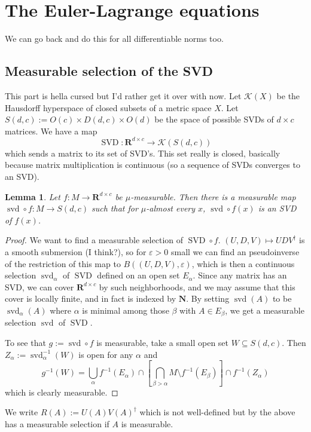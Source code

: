 \documentclass[reqno,11pt]{amsart}
\newcommand{\NN}{\mathbf{N}}
\newcommand{\RR}{\mathbf{R}}
\DeclareMathOperator{\svd}{svd}
\DeclareMathOperator{\SVD}{SVD}
\newtheorem{lemma}[theorem]{Lemma}
\theoremstyle{definition}
\numberwithin{equation}{section}
\begin{document}
\section{The Euler-Lagrange equations}
We can go back and do this for all differentiable norms too.

\subsection{Measurable selection of the SVD}
This part is hella cursed but I'd rather get it over with now.
Let $\mathscr K(X)$ be the Hausdorff hyperspace of closed subsets of a metric space $X$.
Let $S(d, c) := O(c) \times D(d, c) \times O(d)$ be the space of possible SVDs of $d \times c$ matrices.
We have a map 
$$\SVD: \RR^{d \times c} \to \mathscr K(S(d, c))$$
which sends a matrix to its set of SVD's.
This set really is closed, basically because matrix multiplication is continuous (so a sequence of SVDs converges to an SVD).

\begin{lemma}
Let $f: M \to \RR^{d \times c}$ be $\mu$-measurable.
Then there is a measurable map $\svd \circ f: M \to S(d, c)$ such that for $\mu$-almost every $x$, $\svd \circ f(x)$ is an SVD of $f(x)$.
\end{lemma}
\begin{proof}
We want to find a measurable selection of $\SVD \circ f$.
$(U, D, V) \mapsto UDV^\dagger$ is a smooth submersion (I think?), so for $\varepsilon > 0$ small we can find an pseudoinverse of the restriction of this map to $B((U, D, V), \varepsilon)$, which is then a continuous selection $\svd_\alpha$ of $\SVD$ defined on an open set $E_\alpha$.
Since any matrix has an SVD, we can cover $\RR^{d \times c}$ by such neighborhoods, and we may assume that this cover is locally finite, and in fact is indexed by $\NN$.
By setting $\svd(A)$ to be $\svd_\alpha(A)$ where $\alpha$ is minimal among those $\beta$ with $A \in E_\beta$, we get a measurable selection $\svd$ of $\SVD$.

To see that $g := \svd \circ f$ is measurable, take a small open set $W \subseteq S(d, c)$.
Then $Z_\alpha := \svd_\alpha^{-1}(W)$ is open for any $\alpha$ and
$$g^{-1}(W) = \bigcup_\alpha f^{-1}(E_\alpha) \cap \left[\bigcap_{\beta > \alpha} M \setminus f^{-1}(E_\beta)\right] \cap f^{-1}(Z_\alpha)$$
which is clearly measurable.
\end{proof}

We write $R(A) := U(A) V(A)^\dagger$ which is not well-defined but by the above has a measurable selection if $A$ is measurable.
\end{document}
